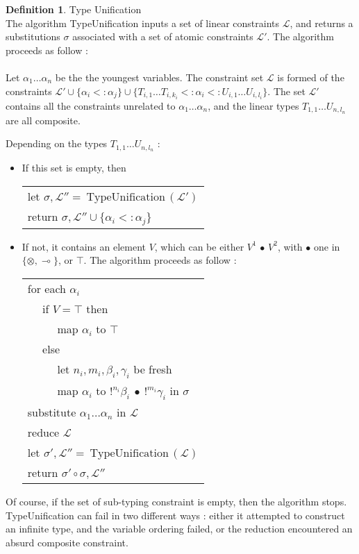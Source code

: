 \documentclass[10pt]{article}
\theoremstyle{plain}
\theoremstyle{definition}
\newtheorem{defn}{Definition}[subsection] %
\begin{document}
\begin{defn}{Type Unification} \\
	The algorithm TypeUnification inputs a set of linear constraints $\mathcal{L}$, and returns
	a substitutions $\sigma$ associated with a set of atomic constraints $\mathcal{L'}$.
	The algorithm proceeds as follow : \\
	\\
  Let $\alpha_1 \dots \alpha_n$ be the the youngest variables. The constraint set $\mathcal{L}$ is formed of the constraints
  $\mathcal{L'} \cup \{ \alpha_i <: \alpha_j \} \cup \{ T_{i, 1} \dots T_{i, k_i} <: \alpha_i <: U_{i, 1} \dots U_{i, l_i} \}$.
  The set $\mathcal{L'}$ contains all the constraints unrelated to $\alpha_1 \dots \alpha_n$,
  and the linear types $T_{1, 1} \dots U_{n, l_n}$ are all composite.
  		
  Depending on the types $T_{1, 1} \dots U_{n, l_n}$ :
	\begin{itemize}
		\item If this set is empty, then \\
			\begin{tabular}{l}
				let $\sigma, \mathcal{L''} = ~\text{TypeUnification}\,(\mathcal{L'})$ \\
				return $\sigma, \mathcal{L''} \cup \{ \alpha_i <: \alpha_j \}$
			\end{tabular}
	  
	  \item If not, it contains an element $V$, which can be either $V^1 \,\bullet \, V^2$, with $\bullet$ one in $\{ \otimes, \multimap \}$, or
	  	$\top$. The algorithm proceeds as follow :\\
	  	\begin{tabular}{l}
	  		for each $\alpha_i$ \\
	  		~~ if $V = \top$ then \\
	  		~~ ~~ map $\alpha_i$ to $\top$ \\
	  		~~ else \\
	  		~~ ~~ let $n_i, m_i, \beta_i, \gamma_i$ be fresh \\
	  		~~ ~~ map $\alpha_i$ to $!^{n_i} \beta_i ~\bullet~ !^{m_i}\gamma_i$ in $\sigma$ \\
	  		substitute $\alpha_1 \dots \alpha_n$ in $\mathcal{L}$ \\
	  		reduce $\mathcal{L}$ \\
	  		let $\sigma', \mathcal{L''} = ~\text{TypeUnification}\,(\mathcal{L})$ \\
	  		return $\sigma' \circ \sigma, \mathcal{L''}$
	  	\end{tabular}
  \end{itemize}

  Of course, if the set of sub-typing constraint is empty, then the algorithm stops.
  TypeUnification can fail in two different ways : either it attempted to construct an infinite
  type, and the variable ordering failed, or the reduction encountered an absurd composite constraint.
\end{defn}
\end{document}
